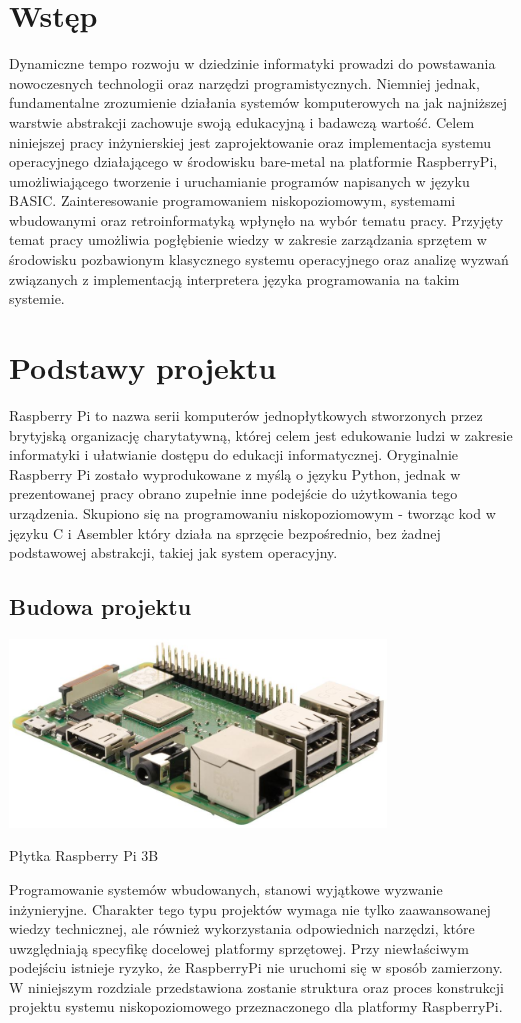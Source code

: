 \documentclass[shortabstract]{iithesis}
\author         {Aleksandra Kosińska \and Cezary Stajszczyk}
\date           {31 sierpnia 2023}                     %
\begin{document}

\chapter*{Wstęp}
Dynamiczne tempo rozwoju w dziedzinie informatyki prowadzi do powstawania nowoczesnych technologii oraz narzędzi programistycznych. Niemniej jednak, fundamentalne zrozumienie działania systemów komputerowych na jak najniższej warstwie abstrakcji zachowuje swoją edukacyjną i badawczą wartość.
Celem niniejszej pracy inżynierskiej jest zaprojektowanie oraz implementacja systemu operacyjnego działającego w środowisku bare-metal na platformie RaspberryPi, umożliwiającego tworzenie i uruchamianie programów napisanych w języku BASIC. Zainteresowanie programowaniem niskopoziomowym, systemami wbudowanymi oraz retroinformatyką wpłynęło na wybór tematu pracy.
Przyjęty temat pracy umożliwia pogłębienie wiedzy w zakresie zarządzania sprzętem w środowisku pozbawionym klasycznego systemu operacyjnego oraz analizę wyzwań związanych z implementacją interpretera języka programowania na takim systemie.


\chapter{Podstawy projektu}
Raspberry Pi to nazwa serii komputerów jednopłytkowych stworzonych przez brytyjską organizację charytatywną, której celem jest edukowanie ludzi w zakresie informatyki i ułatwianie dostępu do edukacji informatycznej. Oryginalnie Raspberry Pi zostało wyprodukowane z myślą o języku Python, jednak w prezentowanej pracy obrano zupełnie inne podejście do użytkowania tego urządzenia. Skupiono się na programowaniu niskopoziomowym - tworząc kod w języku C i Asembler który działa na sprzęcie bezpośrednio, bez żadnej podstawowej abstrakcji, takiej jak system operacyjny.

\section{Budowa projektu}
\begingroup
\centering
\includegraphics[width=0.75\textwidth]{rpi3b.jpg}
\captionsetup{type=figure}
\caption{Płytka Raspberry Pi 3B}
\endgroup
Programowanie systemów wbudowanych, stanowi wyjątkowe wyzwanie inżynieryjne. Charakter tego typu projektów wymaga nie tylko zaawansowanej wiedzy technicznej, ale również wykorzystania odpowiednich narzędzi, które uwzględniają specyfikę docelowej platformy sprzętowej. Przy niewłaściwym podejściu istnieje ryzyko, że RaspberryPi nie uruchomi się w sposób zamierzony. W niniejszym rozdziale przedstawiona zostanie struktura oraz proces konstrukcji projektu systemu niskopoziomowego przeznaczonego dla platformy RaspberryPi.
\end{document}
